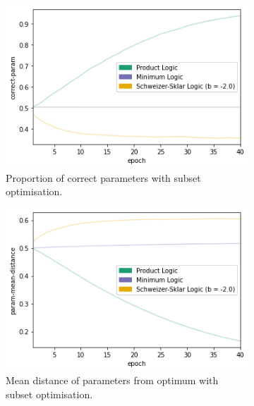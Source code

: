 \begin{figure}[h]
    \centering
    \begin{subfigure}[t]{0.45\textwidth}
        \centering
        \includegraphics[width=\textwidth]{imgs/conj-cp-10000dim-keep50-5t-bce.png}
        \caption{Proportion of correct parameters with subset optimisation.}
        \label{fig:conjconvcpbceso}
    \end{subfigure}
    \begin{subfigure}[t]{0.45\textwidth}
        \centering
        \includegraphics[width=\textwidth]{imgs/conj-pmd-10000dim-keep50-5t-bce.png}
        \caption{Mean distance of parameters from optimum with subset optimisation.}
        \label{fig:conjconvpmdbceso}
    \end{subfigure}
    \begin{subfigure}[t]{0.45\textwidth}
        \centering

\end{subfigure}
\end{figure}
